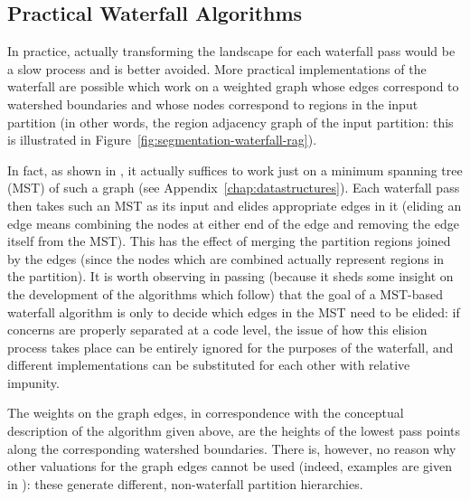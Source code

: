 
\subsection{Practical Waterfall Algorithms}

In practice, actually transforming the landscape for each waterfall pass would be a slow process and is better avoided. More practical implementations of the waterfall are possible which work on a weighted graph whose edges correspond to watershed boundaries and whose nodes correspond to regions in the input partition (in other words, the region adjacency graph of the input partition: this is illustrated in Figure~\ref{fig:segmentation-waterfall-rag}).


In fact, as shown in \cite{marcotegui05}, it actually suffices to work just on a minimum spanning tree (MST) of such a graph (see Appendix~\ref{chap:datastructures}). Each waterfall pass then takes such an MST as its input and elides appropriate edges in it (eliding an edge means combining the nodes at either end of the edge and removing the edge itself from the MST). This has the effect of merging the partition regions joined by the edges (since the nodes which are combined actually represent regions in the partition). It is worth observing in passing (because it sheds some insight on the development of the algorithms which follow) that the goal of a MST-based waterfall algorithm is only to decide which edges in the MST need to be elided: if concerns are properly separated at a code level, the issue of how this elision process takes place can be entirely ignored for the purposes of the waterfall, and different implementations can be substituted for each other with relative impunity.

The weights on the graph edges, in correspondence with the conceptual description of the algorithm given above, are the heights of the lowest pass points along the corresponding watershed boundaries. There is, however, no reason why other valuations for the graph edges cannot be used (indeed, examples are given in \cite{marcotegui05}): these generate different, non-waterfall partition hierarchies.


